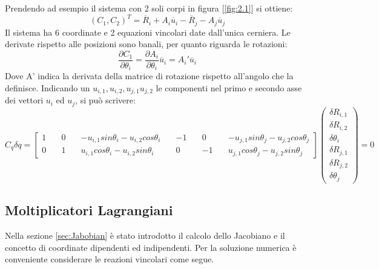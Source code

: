 Prendendo ad esempio il sistema con 2 soli corpi in figura [\ref{fig:2.1}] si ottiene:
\[ (C_1 , C_2)^T = \overline{R}_i + A_i\overline{u}_i -\overline{R}_j - A_j\overline{u}_j \]
Il sistema ha 6 coordinate e 2 equazioni vincolari date dall'unica cerniera. Le derivate rispetto alle posizioni sono banali, per quanto riguarda le rotazioni:
\[\frac{\partial C_1}{\partial \theta_i } = \frac{\partial A_i}{\partial \theta_i } \overline{u}_i  = A_i'\overline{u}_i\]
Dove A' indica la derivata della matrice di rotazione rispetto all'angolo che la definisce. Indicando un $u_{i,1}, u_{i,2}, u_{j,1} u_{j,2}$ le componenti nel primo e secondo asse dei vettori $u_i$ ed $u_j$, si può scrivere:
\begin{equation} C_q \delta q = 
\begin{bmatrix}
1 \quad & 0\quad & -u_{i,1}sin\theta_i-u_{i,2}cos\theta_i \quad& -1 \quad& 0 \quad& -u_{j,1}sin\theta_j-u_{j,2}cos\theta_j \\
0 \quad& 1 \quad& u_{i,1}cos\theta_i-u_{i,2}sin\theta_i \quad& 0 \quad& -1 \quad& u_{j,1}cos\theta_j-u_{j,2}sin\theta_j
\end{bmatrix}
\begin{pmatrix}
\delta R_{i,1} \\ \delta R_{i,2} \\ \delta \theta_i \\ \delta R_{j,1} \\ \delta R_{j,2} \\ \delta \theta_j 
\end{pmatrix} = 0
\end{equation}

\subsection{Moltiplicatori Lagrangiani}
Nella sezione  \ref{sec:Jabobian} è stato introdotto il calcolo dello Jacobiano e il concetto di coordinate dipendenti ed indipendenti. Per la soluzione numerica è conveniente considerare le reazioni vincolari come segue. \newline
